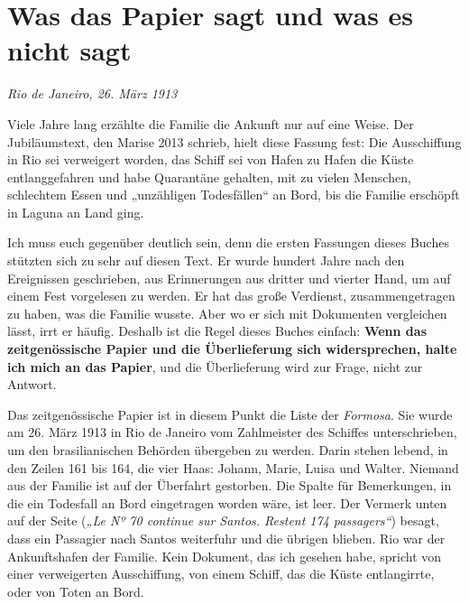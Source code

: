 \documentclass[
  ngerman,
  11pt,
  openany]{book}
\begin{document}
\section{Was das Papier sagt und was es nicht
sagt}\label{was-das-papier-sagt-und-was-es-nicht-sagt}

\emph{Rio de Janeiro, 26. März 1913}

Viele Jahre lang erzählte die Familie die Ankunft nur auf eine Weise.
Der Jubiläumstext, den Marise 2013 schrieb, hielt diese Fassung fest:
Die Ausschiffung in Rio sei verweigert worden, das Schiff sei von Hafen
zu Hafen die Küste entlanggefahren und habe Quarantäne gehalten, mit zu
vielen Menschen, schlechtem Essen und „unzähligen Todesfällen`` an Bord,
bis die Familie erschöpft in Laguna an Land ging.

Ich muss euch gegenüber deutlich sein, denn die ersten Fassungen dieses
Buches stützten sich zu sehr auf diesen Text. Er wurde hundert Jahre
nach den Ereignissen geschrieben, aus Erinnerungen aus dritter und
vierter Hand, um auf einem Fest vorgelesen zu werden. Er hat das große
Verdienst, zusammengetragen zu haben, was die Familie wusste. Aber wo er
sich mit Dokumenten vergleichen lässt, irrt er häufig. Deshalb ist die
Regel dieses Buches einfach: \textbf{Wenn das zeitgenössische Papier und
die Überlieferung sich widersprechen, halte ich mich an das Papier}, und
die Überlieferung wird zur Frage, nicht zur Antwort.

Das zeitgenössische Papier ist in diesem Punkt die Liste der
\emph{Formosa}. Sie wurde am 26. März 1913 in Rio de Janeiro vom
Zahlmeister des Schiffes unterschrieben, um den brasilianischen Behörden
übergeben zu werden. Darin stehen lebend, in den Zeilen 161 bis 164, die
vier Haas: Johann, Marie, Luisa und Walter. Niemand aus der Familie ist
auf der Überfahrt gestorben. Die Spalte für Bemerkungen, in die ein
Todesfall an Bord eingetragen worden wäre, ist leer. Der Vermerk unten
auf der Seite (\emph{„Le Nº 70 continue sur Santos. Restent 174
passagers``}) besagt, dass ein Passagier nach Santos weiterfuhr und die
übrigen blieben. Rio war der Ankunftshafen der Familie. Kein Dokument,
das ich gesehen habe, spricht von einer verweigerten Ausschiffung, von
einem Schiff, das die Küste entlangirrte, oder von Toten an Bord.
\end{document}
